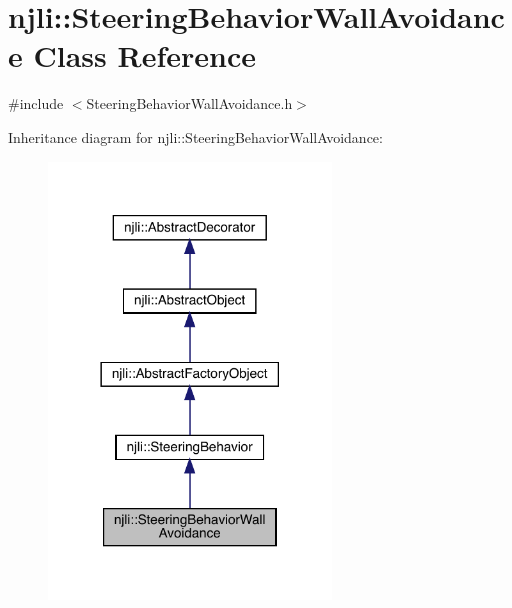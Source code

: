 \hypertarget{classnjli_1_1_steering_behavior_wall_avoidance}{}\section{njli\+:\+:Steering\+Behavior\+Wall\+Avoidance Class Reference}
\label{classnjli_1_1_steering_behavior_wall_avoidance}


{\ttfamily \#include $<$Steering\+Behavior\+Wall\+Avoidance.\+h$>$}



Inheritance diagram for njli\+:\+:Steering\+Behavior\+Wall\+Avoidance\+:\nopagebreak
\begin{figure}[H]
\begin{center}
\leavevmode
\includegraphics[width=213pt]{classnjli_1_1_steering_behavior_wall_avoidance__inherit__graph}
\end{center}
\end{figure}


